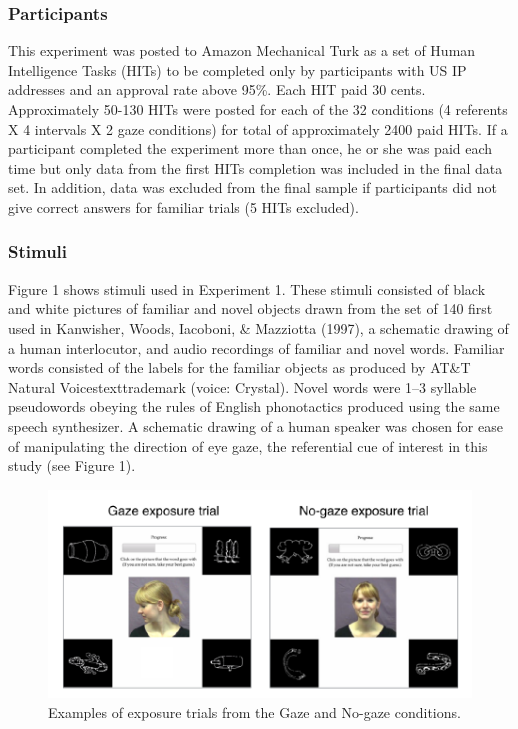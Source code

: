 \documentclass[12pt,]{article}
\begin{document}
\subsubsection{Participants}\label{participants}

This experiment was posted to Amazon Mechanical Turk as a set of Human
Intelligence Tasks (HITs) to be completed only by participants with US
IP addresses and an approval rate above 95\%. Each HIT paid 30 cents.
Approximately 50-130 HITs were posted for each of the 32 conditions (4
referents X 4 intervals X 2 gaze conditions) for total of approximately
2400 paid HITs. If a participant completed the experiment more than
once, he or she was paid each time but only data from the first HITs
completion was included in the final data set. In addition, data was
excluded from the final sample if participants did not give correct
answers for familiar trials (5 HITs excluded).

\subsubsection{Stimuli}\label{stimuli}

Figure 1 shows stimuli used in Experiment 1. These stimuli consisted of
black and white pictures of familiar and novel objects drawn from the
set of 140 first used in Kanwisher, Woods, Iacoboni, \& Mazziotta
(1997), a schematic drawing of a human interlocutor, and audio
recordings of familiar and novel words. Familiar words consisted of the
labels for the familiar objects as produced by AT\&T Natural
Voicestexttrademark (voice: Crystal). Novel words were 1--3 syllable
pseudowords obeying the rules of English phonotactics produced using the
same speech synthesizer. A schematic drawing of a human speaker was
chosen for ease of manipulating the direction of eye gaze, the
referential cue of interest in this study (see Figure 1).

\begin{figure}[htbp]
\centering
\includegraphics{figs/stimuli-1.pdf}
\caption{Examples of exposure trials from the Gaze and No-gaze
conditions.}
\end{figure}
\end{document}
